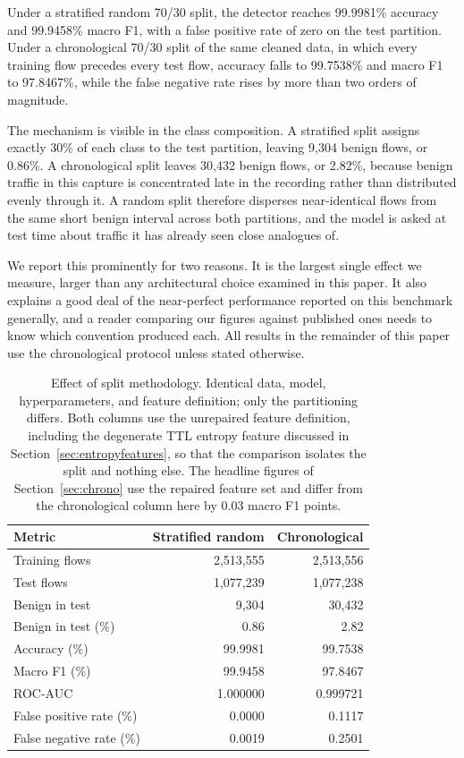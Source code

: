 \documentclass{ieeeaccess}
\begin{document}
Under a stratified random 70/30 split, the detector reaches 99.9981\% accuracy and 99.9458\% macro F1, with a false positive rate of zero on the test partition. Under a chronological 70/30 split of the same cleaned data, in which every training flow precedes every test flow, accuracy falls to 99.7538\% and macro F1 to 97.8467\%, while the false negative rate rises by more than two orders of magnitude.

The mechanism is visible in the class composition. A stratified split assigns exactly 30\% of each class to the test partition, leaving 9,304 benign flows, or 0.86\%. A chronological split leaves 30,432 benign flows, or 2.82\%, because benign traffic in this capture is concentrated late in the recording rather than distributed evenly through it. A random split therefore disperses near-identical flows from the same short benign interval across both partitions, and the model is asked at test time about traffic it has already seen close analogues of.

We report this prominently for two reasons. It is the largest single effect we measure, larger than any architectural choice examined in this paper. It also explains a good deal of the near-perfect performance reported on this benchmark generally, and a reader comparing our figures against published ones needs to know which convention produced each. All results in the remainder of this paper use the chronological protocol unless stated otherwise.

\begin{table}[!t]
\caption{Effect of split methodology. Identical data, model, hyperparameters, and feature definition; only the partitioning differs. Both columns use the unrepaired feature definition, including the degenerate TTL entropy feature discussed in Section~\ref{sec:entropyfeatures}, so that the comparison isolates the split and nothing else. The headline figures of Section~\ref{sec:chrono} use the repaired feature set and differ from the chronological column here by 0.03 macro F1 points.}
\centering
\label{tab:splitcompare}
\footnotesize
\setlength{\tabcolsep}{4pt}
\renewcommand{\arraystretch}{1.2}
\begin{tabular}{@{}lrr@{}}
\toprule
\textbf{Metric} & \textbf{Stratified random} & \textbf{Chronological} \\
\midrule
Training flows            & 2,513,555 & 2,513,556 \\
Test flows                & 1,077,239 & 1,077,238 \\
Benign in test            & 9,304     & 30,432 \\
Benign in test (\%)       & 0.86      & 2.82 \\
\midrule
Accuracy (\%)             & 99.9981   & 99.7538 \\
Macro F1 (\%)             & 99.9458   & 97.8467 \\
ROC-AUC                   & 1.000000  & 0.999721 \\
False positive rate (\%)  & 0.0000    & 0.1117 \\
False negative rate (\%)  & 0.0019    & 0.2501 \\
\bottomrule
\end{tabular}
\end{table}
\end{document}
